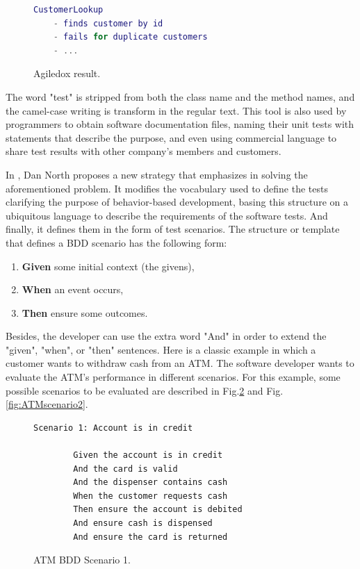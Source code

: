\documentclass[journal]{IEEEtran}	%
\begin{document}
\begin{figure}[t!]
\centering
\begin{lstlisting}[language=Matlab]
    CustomerLookup
    - finds customer by id
    - fails for duplicate customers
    - ...
\end{lstlisting}
\caption{Agiledox result.}
\label{fig:agiledox}
\end{figure}

The word "test" is stripped from both the class name and the method names, and the camel-case writing is transform in the regular text. This tool is also used by programmers to obtain software documentation files, naming their unit tests with statements that describe the purpose, and even using commercial language to share test results with other company's members and customers.

In \cite{north2010introducing}, Dan North proposes a new strategy that emphasizes in solving the aforementioned problem. It modifies the vocabulary used to define the tests clarifying the purpose of behavior-based development, basing this structure on a ubiquitous language to describe the requirements of the software tests. And finally, it defines them in the form of test scenarios. The structure or template that defines a BDD scenario has the following form:

\begin{enumerate}
    \item \textbf{Given} some initial context (the givens),
    \item \textbf{When} an event occurs,
    \item \textbf{Then} ensure some outcomes. 
\end{enumerate}

Besides, the developer can use the extra word "And" in order to extend the "given", "when", or "then" sentences. Here is a classic example in which a customer wants to withdraw cash from an ATM. The software developer wants to evaluate the ATM's performance in different scenarios. For this example, some possible scenarios to be evaluated are described in Fig.\ref{fig:ATMscenario1} and Fig. \ref{fig:ATMscenario2}.

\begin{figure}[t!]
\centering
\begin{lstlisting}[]
    Scenario 1: Account is in credit

        Given the account is in credit
        And the card is valid
        And the dispenser contains cash
        When the customer requests cash
        Then ensure the account is debited
        And ensure cash is dispensed
        And ensure the card is returned
\end{lstlisting}
\caption{ATM BDD Scenario 1.}
\label{fig:ATMscenario1}
\end{figure}
\end{document}
